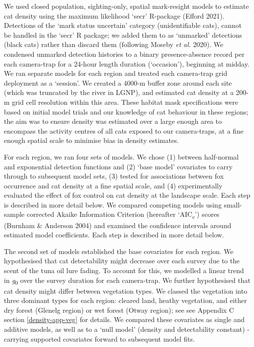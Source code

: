 \documentclass[11pt,a4paper,titlepage,twoside,openright]{style/unimelbthesis}
\begin{document}
\begin{mainmatter}
We used closed population, sighting-only, spatial mark-resight models to estimate cat density using the maximum likelihood `secr' R-package (Efford 2021). Detections of the `mark status uncertain' category (unidentifiable cats), cannot be handled in the `secr' R package; we added them to as `unmarked' detections (black cats) rather than discard them (following Moseby \emph{et al.} 2020). We condensed unmarked detection histories to a binary presence-absence record per each camera-trap for a 24-hour length duration (`occasion'), beginning at midday. We ran separate models for each region and treated each camera-trap grid deployment as a `session'. We created a 4000-m buffer zone around each site (which was truncated by the river in LGNP), and estimated cat density at a 200-m grid cell resolution within this area. These habitat mask specifications were based on initial model trials and our knowledge of cat behaviour in these regions; the aim was to ensure density was estimated over a large enough area to encompass the activity centres of all cats exposed to our camera-traps, at a fine enough spatial scale to minimise bias in density estimates.

For each region, we ran four sets of models. We chose (1) between half-normal and exponential detection functions and (2) `base model' covariates to carry through to subsequent model sets, (3) tested for associations between fox occurrence and cat density at a fine spatial scale, and (4) experimentally evaluated the effect of fox control on cat density at the landscape scale. Each step is described in more detail below. We compared competing models using small-sample corrected Akaike Information Criterion (hereafter `AIC\textsubscript{c}') scores (Burnham \& Anderson 2004) and examined the confidence intervals around estimated model coefficients. Each step is described in more detail below.

The second set of models established the base covariates for each region. We hypothesised that cat detectability might decrease over each survey due to the scent of the tuna oil lure fading. To account for this, we modelled a linear trend in \emph{g}\textsubscript{0} over the survey duration for each camera-trap. We further hypothesised that cat density might differ between vegetation types. We classed the vegetation into three dominant types for each region: cleared land, heathy vegetation, and either dry forest (Glenelg region) or wet forest (Otway region); see see Appendix C section \ref{density-app-veg} for details. We compared these covariates as single and additive models, as well as to a `null model' (density and detectability constant) - carrying supported covariates forward to subsequent model fits.


\end{mainmatter}
\end{document}
